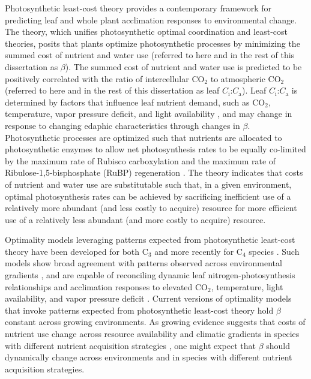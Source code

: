 Photosynthetic least-cost theory  provides a contemporary framework for predicting leaf and whole plant acclimation responses to environmental change. The theory, which unifies photosynthetic optimal coordination  and least-cost  theories, posits that plants optimize photosynthetic processes by minimizing the summed cost of nutrient and water use (referred to here and in the rest of this dissertation as $\beta$). The summed cost of nutrient and water use is predicted to be positively correlated with the ratio of intercellular CO$_2$ to atmospheric CO$_2$ (referred to here and in the rest of this dissertation as leaf $C_\mathrm{i}$:$C_\mathrm{a}$). Leaf $C_\mathrm{i}$:$C_\mathrm{a}$ is determined by factors that influence leaf nutrient demand, such as CO$_2$, temperature, vapor pressure deficit, and light availability , and may change in response to changing edaphic characteristics through changes in $\beta$. Photosynthetic processes are optimized such that nutrients are allocated to photosynthetic enzymes to allow net photosynthesis rates to be equally co-limited by the maximum rate of Rubisco carboxylation and the maximum rate of Ribulose-1,5-bisphosphate (RuBP) regeneration . The theory indicates that costs of nutrient and water use are substitutable such that, in a given environment, optimal photosynthesis rates can be achieved by sacrificing inefficient use of a relatively more abundant (and less costly to acquire) resource for more efficient use of a relatively less abundant (and more costly to acquire) resource.

Optimality models leveraging patterns expected from photosynthetic least-cost theory have been developed for both C$_3$  and more recently for C$_4$ species . Such models show broad agreement with patterns observed across environmental gradients , and are capable of reconciling dynamic leaf nitrogen-photosynthesis relationships and acclimation responses to elevated CO$_2$, temperature, light availability, and vapor pressure deficit . Current versions of optimality models that invoke patterns expected from photosynthetic least-cost theory hold $\beta$ constant across growing environments. As growing evidence suggests that costs of nutrient use change across resource availability and climatic gradients in species with different nutrient acquisition strategies , one might expect that $\beta$ should dynamically change across environments and in species with different nutrient acquisition strategies.

